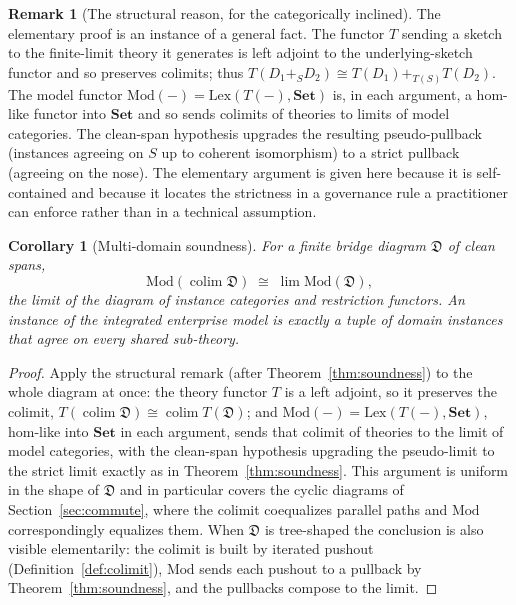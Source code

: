 \documentclass[11pt]{article}
\theoremstyle{plain}
\newtheorem{corollary}{Corollary}
\theoremstyle{definition}
\newtheorem{remark}{Remark}
\newcommand{\Set}{\mathbf{Set}}
\newcommand{\Mod}{\mathrm{Mod}}
\newcommand{\Lex}{\mathrm{Lex}}
\begin{document}
\begin{remark}[The structural reason, for the categorically inclined]
The elementary proof is an instance of a general fact. The functor $T$ sending a sketch to the finite-limit theory it generates \cite{barr-wells} is left adjoint to the underlying-sketch functor and so preserves colimits; thus $T(D_1+_SD_2)\cong T(D_1)+_{T(S)}T(D_2)$. The model functor $\Mod(-)=\Lex(T(-),\Set)$ is, in each argument, a hom-like functor into $\Set$ and so sends colimits of theories to limits of model categories. The clean-span hypothesis upgrades the resulting pseudo-pullback (instances agreeing on $S$ up to coherent isomorphism) to a strict pullback (agreeing on the nose). The elementary argument is given here because it is self-contained and because it locates the strictness in a governance rule a practitioner can enforce rather than in a technical assumption.
\end{remark}

\begin{corollary}[Multi-domain soundness]\label{cor:multi}
For a finite bridge diagram $\mathfrak{D}$ of clean spans,
\[
\Mod(\operatorname{colim}\mathfrak{D})\;\cong\;\lim \Mod(\mathfrak{D}),
\]
the limit of the diagram of instance categories and restriction functors. An instance of the integrated enterprise model is exactly a tuple of domain instances that agree on every shared sub-theory.
\end{corollary}

\begin{proof}
Apply the structural remark (after Theorem~\ref{thm:soundness}) to the whole diagram at once: the theory functor $T$ is a left adjoint, so it preserves the colimit, $T(\operatorname{colim}\mathfrak{D})\cong\operatorname{colim} T(\mathfrak{D})$; and $\Mod(-)=\Lex(T(-),\Set)$, hom-like into $\Set$ in each argument, sends that colimit of theories to the limit of model categories, with the clean-span hypothesis upgrading the pseudo-limit to the strict limit exactly as in Theorem~\ref{thm:soundness}. This argument is uniform in the shape of $\mathfrak{D}$ and in particular covers the cyclic diagrams of Section~\ref{sec:commute}, where the colimit coequalizes parallel paths and $\Mod$ correspondingly equalizes them. When $\mathfrak{D}$ is tree-shaped the conclusion is also visible elementarily: the colimit is built by iterated pushout (Definition~\ref{def:colimit}), $\Mod$ sends each pushout to a pullback by Theorem~\ref{thm:soundness}, and the pullbacks compose to the limit.
\end{proof}
\end{document}
